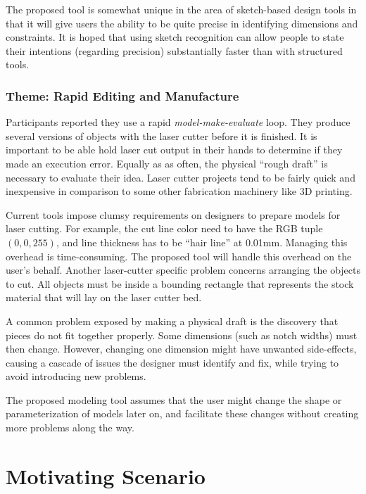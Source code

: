 \documentclass[11pt]{article}
\begin{document}
The proposed tool is somewhat unique in the area of sketch-based
design tools in that it will give users the ability to be quite
precise in identifying dimensions and constraints. It is hoped that
using sketch recognition can allow people to state their intentions
(regarding precision) substantially faster than with structured tools.

\subsubsection{Theme: Rapid Editing and Manufacture}

Participants reported they use a rapid \textit{model-make-evaluate}
loop. They produce several versions of objects with the laser cutter
before it is finished. It is important to be able hold laser cut
output in their hands to determine if they made an execution
error. Equally as as often, the physical ``rough draft'' is necessary
to evaluate their idea. Laser cutter projects tend to be fairly quick
and inexpensive in comparison to some other fabrication machinery like
3D printing.

Current tools impose clumsy requirements on designers to prepare
models for laser cutting. For example, the cut line color need to have
the RGB tuple $(0,0,255)$, and line thickness has to be ``hair line''
at 0.01mm. Managing this overhead is time-consuming. The proposed tool
will handle this overhead on the user's behalf. Another laser-cutter
specific problem concerns arranging the objects to cut. All objects
must be inside a bounding rectangle that represents the stock material
that will lay on the laser cutter bed.

A common problem exposed by making a physical draft is the discovery
that pieces do not fit together properly. Some dimensions (such as
notch widths) must then change. However, changing one dimension might
have unwanted side-effects, causing a cascade of issues the designer
must identify and fix, while trying to avoid introducing new problems.

The proposed modeling tool assumes that the user might change the
shape or parameterization of models later on, and facilitate these
changes without creating more problems along the way. 

\section{Motivating Scenario}
\label{sec:motivating-scenario}
\end{document}
